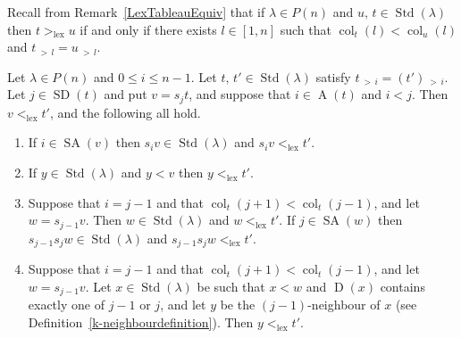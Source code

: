\documentclass[ALCO,ThmDefs,Unicode,epreuves]{cedram}
\DeclareMathOperator{\lex}{lex}
\DeclareMathOperator{\col}{col}
\newcommand{\morethan}[2]{#1\,{_{>\,#2}}}
\DeclareMathOperator{\STD}{Std}
\DeclareMathOperator{\SD}{SD}
\DeclareMathOperator{\SA}{SA}
\DeclareMathOperator{\D}{D}
\DeclareMathOperator{\A}{A}
\begin{document}
Recall from Remark~\ref{LexTableauEquiv} that if $\lambda\in P(n)$ and
$u,\,t\in\STD(\lambda)$ then $t>_{\lex}u$ if and only if there exists $l\in[1,n]$
such that $\col_t(l)<\col_u(l)$ and $\morethan tl=\morethan ul$.
\begin{lemm}\label{xlexlessthant}
Let $\lambda\in P(n)$ and $0\leqslant i\leqslant n-1$. Let $t,\,t'\in\STD(\lambda)$ satisfy
$\morethan ti=\morethan {(t')}i$. Let $j\in \SD(t)$ and put $v=s_jt$, and suppose that
$i\in\A(t)$ and $i<j$. Then $v<_{\lex}t'$, and the following all hold.
\begin{enumerate}[label=(\roman*)]
\item\label{lemma7.30_i} If $i\in\SA(v)$ then $s_iv\in\STD(\lambda)$ and $s_iv<_{\lex}t'$.
\item\label{lemma7.30_ii} If $y\in\STD(\lambda)$ and $y<v$ then $y<_{\lex}t'$.
\item\label{lemma7.30_iii} Suppose that $i=j-1$ and that $\col_t(j+1)<\col_t(j-1)$, and
let $w=s_{j-1}v$. Then $w\in\STD(\lambda)$ and $w<_{\lex}t'$.
If $j\in\SA(w)$ then $s_{j-1}s_jw\in\STD(\lambda)$ and $s_{j-1}s_jw<_{\lex}t'$.
\item\label{lemma7.30_iv} Suppose that $i=j-1$ and that $\col_t(j+1)<\col_t(j-1)$, and
let $w=s_{j-1}v$. Let $x\in\STD(\lambda)$ be such that $x<w$ and $\D(x)$
contains exactly one of $j-1$ or $j$, and let $y$ be the $(j-1)$-neighbour
of $x$ (see Definition~\ref{k-neighbourdefinition}). Then $y<_{\lex}t'$.
\end{enumerate}
\end{lemm}
\end{document}
